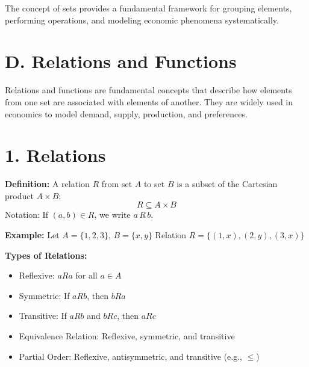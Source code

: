 \begin{tcolorbox}[sectionbox]

The concept of sets provides a fundamental framework for grouping elements, performing operations, and modeling economic phenomena systematically.
\end{tcolorbox}

\section*{D. Relations and Functions}

\begin{tcolorbox}[sectionbox]
Relations and functions are fundamental concepts that describe how elements from one set are associated with elements of another. They are widely used in economics to model demand, supply, production, and preferences.
\end{tcolorbox}

\section*{1. Relations}

\begin{tcolorbox}[sectionbox]
\textbf{Definition:} A relation $R$ from set $A$ to set $B$ is a subset of the Cartesian product $A \times B$:
\[
R \subseteq A \times B
\]
Notation: If $(a,b) \in R$, we write $a \, R \, b$.
\end{tcolorbox}

\begin{tcolorbox}[examplebox]
\textbf{Example:} Let $A = \{1,2,3\}$, $B = \{x,y\}$  
Relation $R = \{(1,x),(2,y),(3,x)\}$
\end{tcolorbox}

\begin{tcolorbox}[sectionbox]
\textbf{Types of Relations:}
\begin{itemize}
    \item Reflexive: $a R a$ for all $a \in A$
    \item Symmetric: If $a R b$, then $b R a$
    \item Transitive: If $a R b$ and $b R c$, then $a R c$
    \item Equivalence Relation: Reflexive, symmetric, and transitive
    \item Partial Order: Reflexive, antisymmetric, and transitive (e.g., $\le$)
\end{itemize}
\end{tcolorbox}

